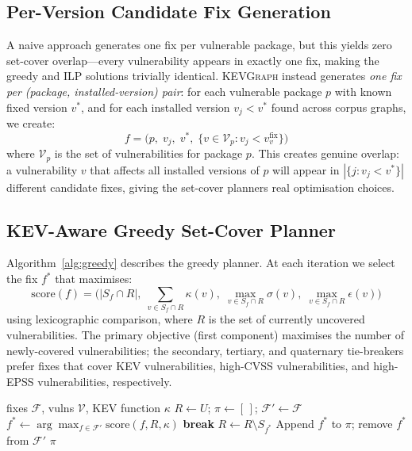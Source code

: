 \documentclass[conference]{IEEEtran}
\newcommand{\kevgraph}{\textsc{KEVGraph}\xspace}
\begin{document}
\subsection{Per-Version Candidate Fix Generation}

A naive approach generates one fix per vulnerable package, but this
yields zero set-cover overlap---every vulnerability appears in exactly
one fix, making the greedy and ILP solutions trivially identical.
\kevgraph instead generates \emph{one fix per (package,
installed-version) pair}: for each vulnerable package $p$ with known
fixed version $v^*$, and for each installed version $v_j < v^*$ found
across corpus graphs, we create:
\[
  f = \bigl(p,\; v_j,\; v^*,\;
    \{v \in \mathcal{V}_p : v_j < v^{\text{fix}}_v\}\bigr)
\]
where $\mathcal{V}_p$ is the set of vulnerabilities for package $p$.
This creates genuine overlap: a vulnerability $v$ that affects all
installed versions of $p$ will appear in $|\{j : v_j < v^*\}|$
different candidate fixes, giving the set-cover planners real
optimisation choices.

\subsection{KEV-Aware Greedy Set-Cover Planner}

Algorithm~\ref{alg:greedy} describes the greedy planner.  At each
iteration we select the fix $f^*$ that maximises:
\[
  \text{score}(f) =
    \bigl(|S_f \cap R|,\;
     \textstyle\sum_{v \in S_f \cap R}\kappa(v),\;
     \max_{v \in S_f \cap R}\sigma(v),\;
     \max_{v \in S_f \cap R}\epsilon(v)\bigr)
\]
using lexicographic comparison, where $R$ is the set of currently
uncovered vulnerabilities.  The primary objective (first component)
maximises the number of newly-covered vulnerabilities; the secondary,
tertiary, and quaternary tie-breakers prefer fixes that cover KEV
vulnerabilities, high-CVSS vulnerabilities, and high-EPSS
vulnerabilities, respectively.

\begin{algorithm}[t]
\caption{KEV-Aware Greedy Set-Cover}
\label{alg:greedy}
\begin{algorithmic}[1]
\Require fixes $\mathcal{F}$, vulns $\mathcal{V}$, KEV function $\kappa$
\State $R \leftarrow U$; $\pi \leftarrow [\,]$; $\mathcal{F}' \leftarrow \mathcal{F}$
  \State $f^* \leftarrow \arg\max_{f \in \mathcal{F}'} \mathrm{score}(f, R, \kappa)$
   \textbf{break} \EndIf
  \State $R \leftarrow R \setminus S_{f^*}$
  \State Append $f^*$ to $\pi$; remove $f^*$ from $\mathcal{F}'$
\EndWhile
\State \Return $\pi$
\end{algorithmic}
\end{algorithm}
\end{document}
